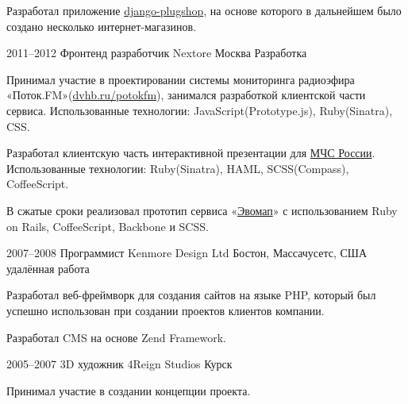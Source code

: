 \documentclass[11pt,a4paper,sans]{moderncv}
\newcommand{\lang}[2]{#1}
\begin{document}
\cvlistitem
    {\lang
        {Разработал приложение \href{https://github.com/ChillyBwoy/django-plugshop}{django-plugshop}, на основе которого в дальнейшем было создано несколько интернет-магазинов.}
        {Design applications ... TODO}\newline}


\cventry
    {2011--2012}
    {\lang
        {Фронтенд разработчик}
        {Front End Developer}}
    {Nextore}
    {\lang
        {Москва}
        {Moscow}}
    {}
    {\lang
        {Разработка}
        {Development}}

\cvlistitem
    {\lang
        {Принимал участие в проектировании системы мониторинга радиоэфира «Поток.FM»(\href{https://dvhb.ru/potokfm}{dvhb.ru/potokfm}), занимался разработкой клиентской части сервиса. Использованные технологии: JavaScript(Prototype.js), Ruby(Sinatra), CSS.}
        {Participated in design of system for monitoring of radio broadcasting, designed front-end part of the project. «Potok.FM»(\href{https://dvhb.ru/en/potokfm}{dvhb.ru/potokfm})}}

\cvlistitem
    {\lang
        {Разработал клиентскую часть интерактивной презентации для \href{http://nextore.ru/projects/3}{МЧС России}. Использованные технологии: Ruby(Sinatra), HAML, SCSS(Compass), CoffeeScript.}
        {TODO}}

\cvlistitem
    {\lang
        {В сжатые сроки реализовал прототип сервиса «\href{http://dvhb.ru/evomap}{Эвомап}» с использованием Ruby on Rails, CoffeeScript, Backbone и SCSS.}
        {TODO}\newline}


\cventry
    {2007--2008}
    {\lang
        {Программист}
        {Developer}}
    {Kenmore Design Ltd}
    {\lang
        {Бостон, Массачусетс, США}
        {Boston, MA, US}}
    {\lang
        {удалённая работа}
        {remote work}}
    {}

\cvlistitem
    {\lang
        {Разработал веб-фреймворк для создания сайтов на языке PHP, который был успешно использован при создании проектов клиентов компании.}
        {TODO}}

\cvlistitem
    {\lang
        {Разработал CMS на основе Zend Framework.}
        {TODO}\newline}


\cventry
    {2005--2007}
    {\lang
        {3D художник}
        {3D Artist}}
    {4Reign Studios}
    {\lang
        {Курск}
        {Kursk}}
    {}
    {}

\cvlistitem
    {\lang
        {Принимал участие в создании концепции проекта.}
        {TODO}}
\end{document}
